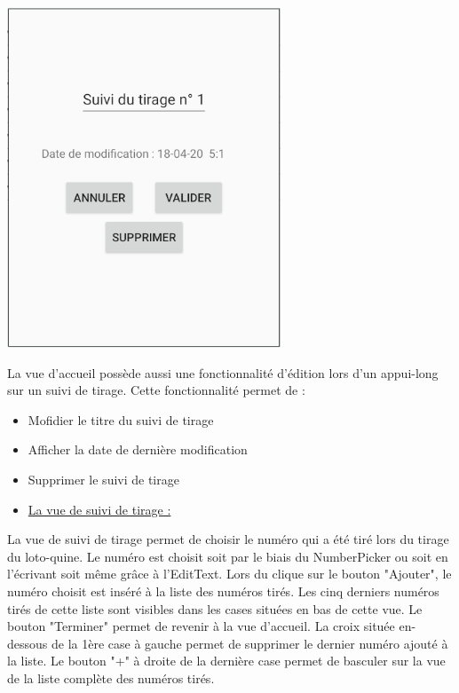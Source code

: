 \documentclass{article}
\begin{document}
    \begin{minipage}{.35\textwidth}%
        \includegraphics[scale=0.6]{edition.png}
    \end{minipage}%
    \hfill
    \begin{minipage}{.6\textwidth}%
    La vue d'accueil possède aussi une fonctionnalité d'édition lors d'un appui-long sur un suivi de tirage. Cette fonctionnalité permet de :
    \vspace{1em}
    \begin{itemize}
        \item Mofidier le titre du suivi de tirage
        \item Afficher la date de dernière modification
        \item Supprimer le suivi de tirage
    \end{itemize}
    \end{minipage}%
\vspace{4em}
\begin{itemize}
    \item {\underline{\large{La vue de suivi de tirage :}}}
\end{itemize}
\vspace{1em}
    \begin{minipage}{.6\textwidth}%
    La vue de suivi de tirage permet de choisir le numéro qui a été tiré lors du tirage du loto-quine. Le numéro est choisit soit par le biais du NumberPicker ou soit en l'écrivant soit même grâce à l'EditText.
    \vspace{1em}
    \newline
    Lors du clique sur le bouton "Ajouter", le numéro choisit est inséré à la liste des numéros tirés. Les cinq derniers numéros tirés de cette liste sont visibles dans les cases situées en bas de cette vue.
    Le bouton "Terminer" permet de revenir à la vue d'accueil.
    \vspace{1em}
    \newline
    La croix située en-dessous de la 1ère case à gauche permet de supprimer le dernier numéro ajouté à la liste.
    \newline
    Le bouton "+" à droite de la dernière case permet de basculer sur la vue de la liste complète des numéros tirés. 
    \end{minipage}%
\end{document}
